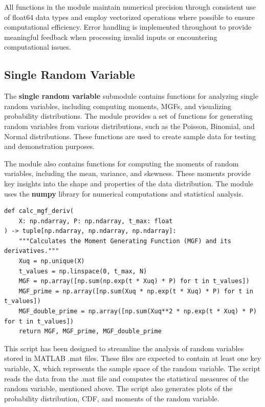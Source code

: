 \documentclass{article}
\begin{document}
All functions in the module maintain numerical precision through consistent use of float64 data types and employ vectorized operations where possible to ensure computational efficiency. Error handling is implemented throughout to provide meaningful feedback when processing invalid inputs or encountering computational issues.

\subsection{Single Random Variable}

The \textbf{single random variable} submodule contains functions for analyzing single random variables, including computing moments, MGFs, and visualizing probability distributions. The module provides a set of functions for generating random variables from various distributions, such as the Poisson, Binomial, and Normal distributions. These functions are used to create sample data for testing and demonstration purposes.

The module also contains functions for computing the moments of random variables, including the mean, variance, and skewness. These moments provide key insights into the shape and properties of the data distribution. The module uses the \textbf{numpy} library for numerical computations and statistical analysis.

\begin{verbatim}
def calc_mgf_deriv(
    X: np.ndarray, P: np.ndarray, t_max: float
) -> tuple[np.ndarray, np.ndarray, np.ndarray]:
    """Calculates the Moment Generating Function (MGF) and its derivatives."""
    Xuq = np.unique(X)
    t_values = np.linspace(0, t_max, N)
    MGF = np.array([np.sum(np.exp(t * Xuq) * P) for t in t_values])
    MGF_prime = np.array([np.sum(Xuq * np.exp(t * Xuq) * P) for t in t_values])
    MGF_double_prime = np.array([np.sum(Xuq**2 * np.exp(t * Xuq) * P) for t in t_values])
    return MGF, MGF_prime, MGF_double_prime
\end{verbatim}

This script has been designed to streamline the analysis of random variables stored in MATLAB .mat files. These files are expected to contain at least one key variable, X, which represents the sample space of the random variable. The script reads the data from the .mat file and computes the statistical measures of the random variable, mentioned above. The script also generates plots of the probability distribution, CDF, and moments of the random variable.
\end{document}
